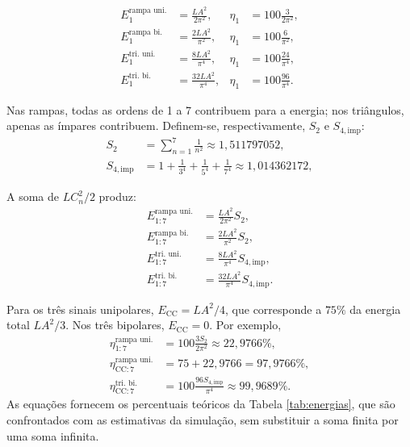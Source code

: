 \begin{equation}
    \begin{aligned}
        E_1^{\text{rampa uni.}}&=\frac{LA^2}{2\pi^2},
            &\eta_1&=100\frac{3}{2\pi^2}, \\
        E_1^{\text{rampa bi.}}&=\frac{2LA^2}{\pi^2},
            &\eta_1&=100\frac{6}{\pi^2}, \\
        E_1^{\text{tri. uni.}}&=\frac{8LA^2}{\pi^4},
            &\eta_1&=100\frac{24}{\pi^4}, \\
        E_1^{\text{tri. bi.}}&=\frac{32LA^2}{\pi^4},
            &\eta_1&=100\frac{96}{\pi^4}.
    \end{aligned}
\end{equation}

Nas rampas, todas as ordens de 1 a 7 contribuem para a energia;
nos triângulos, apenas as ímpares contribuem. Definem-se, respectivamente,
$S_2$ e $S_{4,\mathrm{imp}}$:
\begin{equation}
    \begin{aligned}
        S_2&=\sum_{n=1}^{7}\frac{1}{n^2}\approx1{,}511797052, \\
        S_{4,\mathrm{imp}}&=1+\frac1{3^4}+\frac1{5^4}+\frac1{7^4}
            \approx1{,}014362172,
    \end{aligned}
\end{equation}

A soma de $LC_n^2/2$ produz:
\begin{equation}
    \begin{aligned}
        E_{1:7}^{\text{rampa uni.}}&=\frac{LA^2}{2\pi^2}S_2, \\
        E_{1:7}^{\text{rampa bi.}}&=\frac{2LA^2}{\pi^2}S_2, \\
        E_{1:7}^{\text{tri. uni.}}&=\frac{8LA^2}{\pi^4}S_{4,\mathrm{imp}}, \\
        E_{1:7}^{\text{tri. bi.}}&=\frac{32LA^2}{\pi^4}S_{4,\mathrm{imp}}.
    \end{aligned}
\end{equation}

Para os três sinais unipolares, $E_{\mathrm{CC}}=LA^2/4$,
que corresponde a $75\%$ da energia total $LA^2/3$.
Nos três bipolares, $E_{\mathrm{CC}}=0$. Por exemplo,
\begin{equation}
    \begin{aligned}
        \eta_{1:7}^{\text{rampa uni.}}&=100\frac{3S_2}{2\pi^2}
            \approx22{,}9766\%, \\
        \eta_{\mathrm{CC}:7}^{\text{rampa uni.}}&=75+22{,}9766
            =97{,}9766\%, \\
        \eta_{\mathrm{CC}:7}^{\text{tri. bi.}}&=100\frac{96S_{4,\mathrm{imp}}}{\pi^4}
            \approx99{,}9689\%.
    \end{aligned}
\end{equation}
As equações fornecem os percentuais teóricos da
Tabela \ref{tab:energias}, que são confrontados com as estimativas
da simulação, sem substituir a soma finita por uma soma infinita.

